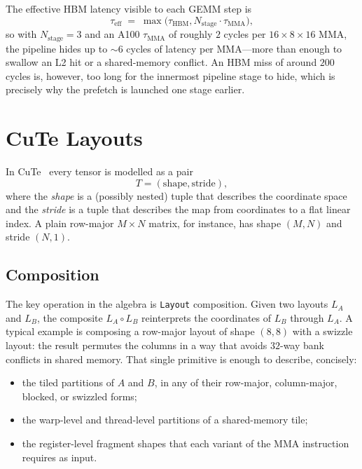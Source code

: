 The effective HBM latency visible to each GEMM step is
\begin{equation}
    \tau_{\text{eff}} \;=\; \max\bigl(\tau_{\text{HBM}},
            N_{\text{stage}} \cdot \tau_{\text{MMA}}\bigr),
\end{equation}
so with $N_{\text{stage}} = 3$ and an A100 $\tau_{\text{MMA}}$ of
roughly $2$ cycles per $16 \times 8 \times 16$ MMA, the pipeline
hides up to $\sim\!6$ cycles of latency per MMA---more than enough
to swallow an L2 hit or a shared-memory conflict. An HBM miss of
around $200$ cycles is, however, too long for the innermost
pipeline stage to hide, which is precisely why the prefetch is
launched one stage earlier.

\section{CuTe Layouts}\label{sec:cute_layouts}
In CuTe~\cite{cutlass} every tensor is modelled as a pair
\[
    T = (\text{shape},\text{stride}),
\]
where the \emph{shape} is a (possibly nested) tuple that describes
the coordinate space and the \emph{stride} is a tuple that
describes the map from coordinates to a flat linear index. A plain
row-major $M \times N$ matrix, for instance, has
shape $(M, N)$ and stride $(N, 1)$.

\subsection{Composition}\label{sec:cute_composition}
The key operation in the algebra is \texttt{Layout} composition.
Given two layouts $L_A$ and $L_B$, the composite $L_A \circ L_B$
reinterprets the coordinates of $L_B$ through $L_A$. A typical
example is composing a row-major layout of shape $(8, 8)$ with a
swizzle layout: the result permutes the columns in a way that
avoids $32$-way bank conflicts in shared memory. That single
primitive is enough to describe, concisely:
\begin{itemize}
    \item the tiled partitions of $A$ and $B$, in any of their
          row-major, column-major, blocked, or swizzled forms;
    \item the warp-level and thread-level partitions of a
          shared-memory tile;
    \item the register-level fragment shapes that each variant of
          the MMA instruction requires as input.
\end{itemize}

